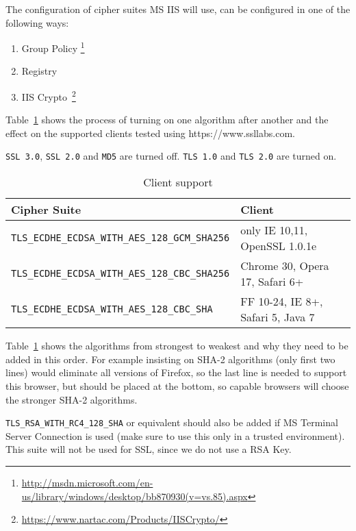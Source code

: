 The configuration of cipher suites MS IIS will use, can be configured in one
of the following ways:
\begin{enumerate}
  \item Group Policy \footnote{\url{http://msdn.microsoft.com/en-us/library/windows/desktop/bb870930(v=vs.85).aspx}}
  \item Registry
  \item IIS Crypto~\footnote{\url{https://www.nartac.com/Products/IISCrypto/}}
\end{enumerate}


Table~\ref{tab:MS_IIS_Client_Support} shows the process of turning on
one algorithm after another and the effect on the supported clients
tested using https://www.ssllabs.com.

\verb|SSL 3.0|, \verb|SSL 2.0| and \verb|MD5| are turned off.
\verb|TLS 1.0| and \verb|TLS 2.0| are turned on.

\begin{table}[h]
  \centering
  \small
  \begin{tabular}{ll}
    \toprule
    Cipher Suite & Client \\
    \midrule
    \verb|TLS_ECDHE_ECDSA_WITH_AES_128_GCM_SHA256| & only IE 10,11, OpenSSL 1.0.1e \\
    \verb|TLS_ECDHE_ECDSA_WITH_AES_128_CBC_SHA256| & Chrome 30, Opera 17, Safari 6+ \\
    \verb|TLS_ECDHE_ECDSA_WITH_AES_128_CBC_SHA| & FF 10-24, IE 8+, Safari 5, Java 7\\
    \bottomrule 
  \end{tabular}
  \caption{Client support}
  \label{tab:MS_IIS_Client_Support}
\end{table}

Table~\ref{tab:MS_IIS_Client_Support} shows the algorithms from
strongest to weakest and why they need to be added in this order. For
example insisting on SHA-2 algorithms (only first two lines) would
eliminate all versions of Firefox, so the last line is needed to
support this browser, but should be placed at the bottom, so capable
browsers will choose the stronger SHA-2 algorithms.

\verb|TLS_RSA_WITH_RC4_128_SHA| or equivalent should also be added if
MS Terminal Server Connection is used (make sure to use this only in a
trusted environment). This suite will not be used for SSL, since we do
not use a RSA Key.


